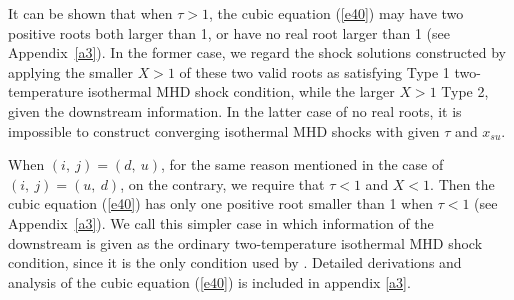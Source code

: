 \documentclass[fleqn,usenatbib]{mnras}
\begin{document}

It can be shown that when $\tau>1$, the cubic equation (\ref{e40}) may have two positive roots both larger than 1, or have no real root larger than 1 (see Appendix~\ref{a3}). In the former case, we regard the shock solutions constructed by applying the smaller $X>1$ of these two valid roots as satisfying Type 1 two-temperature isothermal MHD shock condition, while the larger $X>1$ Type 2, given the downstream information. In the latter case of no real roots, it is impossible to construct converging isothermal MHD shocks with given $\tau$ and $x_{su}$. 


When $(i,\ j)=(d,\ u)$, for the same reason mentioned in the case of $(i,\ j)=(u,\ d)$, on the contrary, we require that $\tau<1$ and $X<1$. Then the cubic equation (\ref{e40}) has only one positive root smaller than 1 when $\tau<1$ (see Appendix~\ref{a3}). We call this simpler case in which information of the downstream is given as the ordinary two-temperature isothermal MHD shock condition, since it is the only condition used by \citet{yuLou2006}. Detailed derivations and analysis of the cubic equation (\ref{e40}) is included in appendix \ref{a3}.
\end{document}
